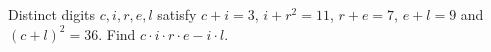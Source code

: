 Distinct digits $c,i,r,e,l$ satisfy $c+i=3$, $i+r^2=11$, $r+e=7$, $e+l=9$ and $(c+l)^2=36$. Find $c\cdot i\cdot r\cdot e-i\cdot l$.
